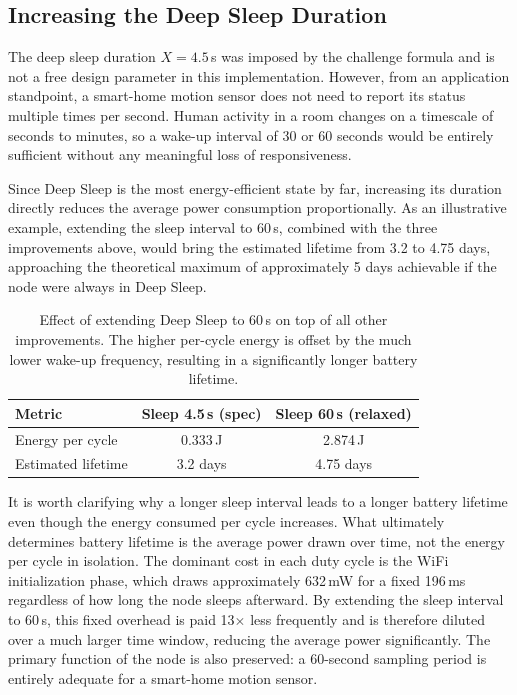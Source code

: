 \documentclass[a4paper,11pt]{article}
\begin{document}
\subsection{Increasing the Deep Sleep Duration}

The deep sleep duration $X = 4.5$\,s was imposed by the challenge formula and is not
a free design parameter in this implementation. However, from an application
standpoint, a smart-home motion sensor does not need to report its status multiple
times per second. Human activity in a room changes on a timescale of seconds to
minutes, so a wake-up interval of 30 or 60 seconds would be entirely sufficient
without any meaningful loss of responsiveness.

Since Deep Sleep is the most energy-efficient state by far, increasing its duration
directly reduces the average power consumption proportionally. As an illustrative
example, extending the sleep interval to 60\,s, combined with the three improvements
above, would bring the estimated lifetime from 3.2 to 4.75 days, approaching the
theoretical maximum of approximately 5 days achievable if the node were always in
Deep Sleep.

\begin{table}[H]
\centering
\begin{tabular}{lcc}
\toprule
\textbf{Metric} & \textbf{Sleep 4.5\,s (spec)} & \textbf{Sleep 60\,s (relaxed)} \\
\midrule
Energy per cycle   & 0.333\,J  & 2.874\,J \\
Estimated lifetime & 3.2 days  & 4.75 days \\
\bottomrule
\end{tabular}
\caption{Effect of extending Deep Sleep to 60\,s on top of all other improvements.
The higher per-cycle energy is offset by the much lower wake-up frequency, resulting
in a significantly longer battery lifetime.}
\end{table}

It is worth clarifying why a longer sleep interval leads to a longer battery lifetime even though the energy consumed per cycle increases. What ultimately determines battery lifetime is the average power drawn over time, not the energy per cycle in isolation. The dominant cost in each duty cycle is the WiFi initialization phase, which draws approximately 632\,mW for a fixed 196\,ms regardless of how long the node sleeps afterward. By extending the sleep interval to 60\,s, this fixed overhead is paid 13$\times$ less frequently and is therefore diluted over a much larger time window, reducing the average power significantly. The primary function of the node is also preserved: a 60-second sampling period is entirely adequate for a smart-home motion sensor.
\end{document}
